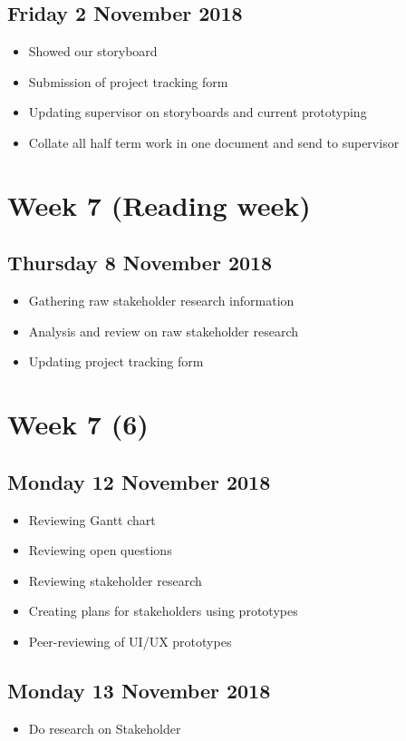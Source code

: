 \subsection*{Friday 2 November 2018}
\begin{itemize}
    \item Showed our storyboard
    \item Submission of project tracking form
	\item Updating supervisor on storyboards and current prototyping
	\item Collate all half term work in one document and send to supervisor
\end{itemize}

\section*{Week 7 (Reading week)}
\subsection*{Thursday 8 November 2018}
\begin{itemize}
	\item Gathering raw stakeholder research information
	\item Analysis and review on raw stakeholder research
	\item Updating project tracking form
\end{itemize}

\section*{Week 7 (6)}
\subsection*{Monday 12 November 2018}
\begin{itemize}
	\item Reviewing Gantt chart
    \item Reviewing open questions
    \item Reviewing stakeholder research
    \item Creating plans for stakeholders using prototypes
    \item Peer-reviewing of UI/UX prototypes
\end{itemize}

\subsection*{Monday 13 November 2018}
\begin{itemize}
	\item Do research on Stakeholder
\end{itemize}

